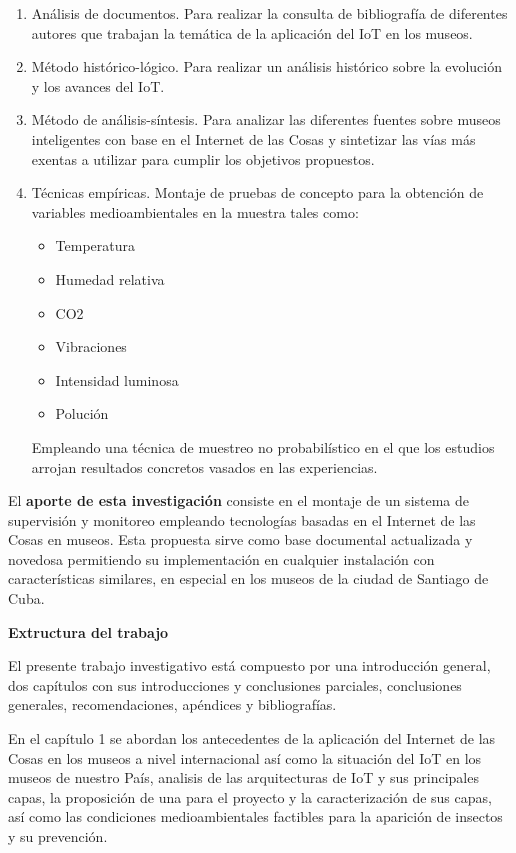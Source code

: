     \begin{enumerate}
        \item Análisis de documentos. Para realizar la consulta de bibliografía de diferentes autores que trabajan la temática de la aplicación del IoT en los museos.
        \item Método histórico-lógico. Para realizar un análisis histórico sobre la evolución y los avances del IoT.
        \item Método de análisis-síntesis. Para analizar las diferentes fuentes sobre museos inteligentes con base en el Internet de las Cosas y sintetizar las vías más exentas a utilizar para cumplir los objetivos propuestos.
        \item Técnicas empíricas. Montaje de pruebas de concepto para la obtención de variables medioambientales en la muestra tales como:
            \begin{itemize}
                \item Temperatura
                \item Humedad relativa
                \item CO2
                \item Vibraciones
                \item Intensidad luminosa
                \item Polución
            \end{itemize}
            Empleando una técnica de muestreo no probabilístico en el que los estudios arrojan resultados concretos vasados en las experiencias.
    \end{enumerate}

    El \textbf{aporte de esta investigación} consiste en el montaje de un sistema de supervisión y monitoreo empleando tecnologías basadas en el Internet de las Cosas en museos. Esta propuesta sirve como base documental actualizada y novedosa permitiendo su implementación en cualquier instalación con características similares, en especial en los museos de la ciudad de Santiago de Cuba.

    \textbf{Extructura del trabajo}

    El presente trabajo investigativo está compuesto por una introducción general, dos capítulos con sus introducciones y conclusiones parciales, conclusiones generales, recomendaciones, apéndices y bibliografías.

    En el capítulo 1 se abordan los antecedentes de la aplicación del Internet de las Cosas en los museos a nivel internacional así como la situación del IoT en los museos de nuestro País, analisis de las arquitecturas de IoT y sus principales capas, la proposición de una para el proyecto y la caracterización de sus capas, así como las condiciones medioambientales factibles para la aparición de insectos y su prevención.


